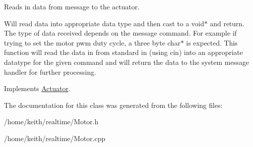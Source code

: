Reads in data from message to the actuator. 

Will read data into appropriate data type and then cast to a void$\ast$ and return. The type of data received depends on the message command. For example if trying to set the motor pwm duty cycle, a three byte char$\ast$ is expected. This function will read the data in from standard in (using cin) into an appropriate datatype for the given command and will return the data to the system message handler for further processing. 

Implements \hyperlink{classActuator_a65fe83ffd7895f3ab028b87a62b3af1d}{Actuator}.



The documentation for this class was generated from the following files\-:\begin{DoxyCompactItemize}
\item 
/home/keith/realtime/Motor.\-h\item 
/home/keith/realtime/Motor.\-cpp\end{DoxyCompactItemize}
